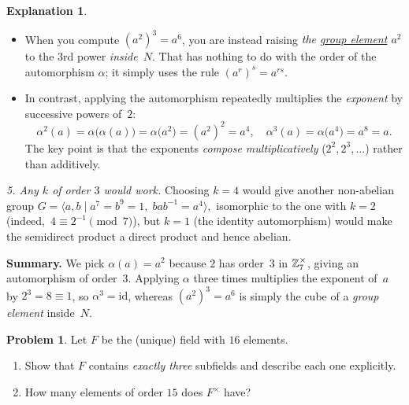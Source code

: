 \documentclass[12pt]{article}
\theoremstyle{definition} %
\newtheorem{problem}{Problem}
\newtheorem{explanation}{Explanation}
\theoremstyle{plain} %
\begin{document}
\begin{explanation}
\begin{itemize}
             \item When you compute \((a^{2})^{3}=a^{6}\), you are instead raising
                   \emph{the \underline{group element} $a^{2}$} to the $3$rd power
                   \emph{inside~$N$}.
                   That has nothing to do with the order of the automorphism
                   $\alpha$; it simply uses the rule \( (a^{r})^{s}=a^{rs}\).
          
             \item In contrast, applying the automorphism repeatedly multiplies
                   the \emph{exponent} by successive powers of~$2$:
                   \[
                      \alpha^{2}(a)=\alpha\!\bigl(\alpha(a)\bigr)=\alpha\!\bigl(a^{2}\bigr)
                         =(a^{2})^{2}=a^{4},\quad
                      \alpha^{3}(a)=\alpha\!\bigl(a^{4}\bigr)=a^{8}=a.
                   \]
                   The key point is that the exponents \emph{compose
                   multiplicatively} (\(2^{2},2^{3},\ldots\)) rather than additively.
          \end{itemize}
          
          \smallskip
          \emph{5.  Any $k$ of order $3$ would work.}
          Choosing $k=4$ would give another non-abelian group
          \(
             G=\langle a,b\mid a^{7}=b^{9}=1,\;bab^{-1}=a^{4}\rangle,
          \)
          isomorphic to the one with $k=2$ (indeed, $\,4\equiv2^{-1}\pmod7$), but
          $k=1$ (the identity automorphism) would make the semidirect product a
          direct product and hence abelian.
          
          \bigskip
          \textbf{Summary.}  
          We pick $\alpha(a)=a^{2}$ because \(2\) has order~$3$ in
          $\Bbb Z_{7}^{\times}$, giving an automorphism of order~$3$.  
          Applying $\alpha$ three times multiplies the exponent of~$a$ by
          \(2^{3}=8\equiv1\), so $\alpha^{3}=\mathrm{id}$,
          whereas \((a^{2})^{3}=a^{6}\) is simply the cube of a \emph{group
          element} inside~$N$.
          \end{explanation}
          \begin{problem}
            Let $F$ be the (unique) field with $16$ elements.
            \begin{enumerate}[]
               \item Show that $F$ contains \emph{exactly three} subfields and
                     describe each one explicitly.
               \item How many elements of order $15$ does $F^{\times}$ have?
            \end{enumerate}
            \end{problem}
            
\end{document}
